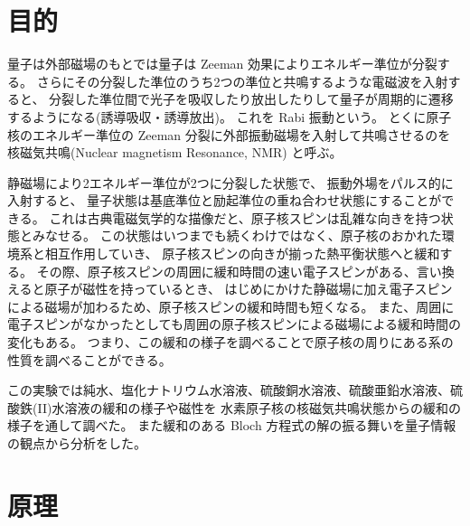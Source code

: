 \documentclass[11pt,dvipdfmx,a4paper]{jsarticle}
\begin{document}
\section{目的}
量子は外部磁場のもとでは量子は Zeeman 効果によりエネルギー準位が分裂する。
さらにその分裂した準位のうち2つの準位と共鳴するような電磁波を入射すると、
分裂した準位間で光子を吸収したり放出したりして量子が周期的に遷移するようになる(誘導吸収・誘導放出)。
これを Rabi 振動という。
とくに原子核のエネルギー準位の Zeeman 分裂に外部振動磁場を入射して共鳴させるのを
核磁気共鳴(Nuclear magnetism Resonance, NMR) と呼ぶ。

静磁場により2エネルギー準位が2つに分裂した状態で、
振動外場をパルス的に入射すると、
量子状態は基底準位と励起準位の重ね合わせ状態にすることができる。
これは古典電磁気学的な描像だと、原子核スピンは乱雑な向きを持つ状態とみなせる。
この状態はいつまでも続くわけではなく、原子核のおかれた環境系と相互作用していき、
原子核スピンの向きが揃った熱平衡状態へと緩和する。
その際、原子核スピンの周囲に緩和時間の速い電子スピンがある、言い換えると原子が磁性を持っているとき、
はじめにかけた静磁場に加え電子スピンによる磁場が加わるため、原子核スピンの緩和時間も短くなる。
また、周囲に電子スピンがなかったとしても周囲の原子核スピンによる磁場による緩和時間の変化もある。
つまり、この緩和の様子を調べることで原子核の周りにある系の性質を調べることができる。

この実験では純水、塩化ナトリウム水溶液、硫酸銅水溶液、硫酸亜鉛水溶液、硫酸鉄(II)水溶液の緩和の様子や磁性を
水素原子核の核磁気共鳴状態からの緩和の様子を通して調べた。
また緩和のある Bloch 方程式の解の振る舞いを量子情報の観点から分析をした。

\section{原理}
\end{document}
